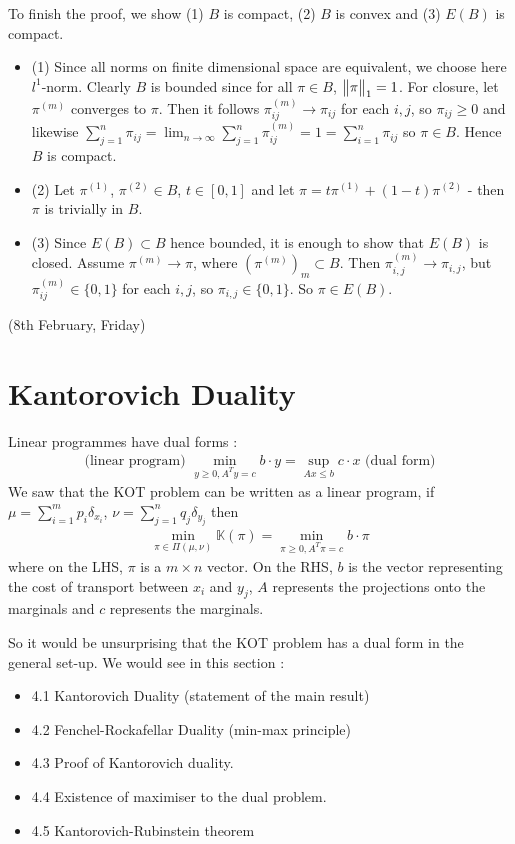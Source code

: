 \documentclass[12pt,a4paper]{article}
\newenvironment{proof}
{\begin{changemargin}{1cm}{0.5cm} 
	}%
	{\end{changemargin}
}
\renewenvironment{i}
{\begin{itemize} 
	}%
	{\end{itemize}
}
\begin{document}
\begin{proof}
To finish the proof, we show (1) $B$ is compact, (2) $B$ is convex and (3) $E(B)$ is compact.
\begin{i}
\item[(1)] Since all norms on finite dimensional space are equivalent, we choose here $l^1$-norm. Clearly $B$ is bounded since for all $\pi \in B$, $\bigl\lVert\pi\bigr\rVert_{1}=1$. For closure, let $\pi^{(m)}$ converges to $\pi$. Then it follows $\pi_{ij}^{(m)} \rightarrow \pi_{ij}$ for each $i,j$, so $\pi_{ij}\geq 0$ and likewise $\sum_{j=1}^n \pi_{ij} = \lim_{n\rightarrow \infty} \sum_{j=1}^n \pi_{ij}^{(m)} =1 = \sum_{i=1}^n \pi_{ij}$ so $\pi \in B$. Hence $B$ is compact.
\item[(2)] Let $\pi^{(1)}$, $\pi^{(2)} \in B$, $t \in [0,1]$ and let $\pi = t\pi^{(1)} + (1-t) \pi^{(2)}$ - then $\pi$ is trivially in $B$.
\item[(3)] Since $E(B) \subset B$ hence bounded, it is enough to show that $E(B)$ is closed. Assume $\pi^{(m)} \rightarrow \pi$, where $(\pi^{(m)})_m \subset B$. Then $\pi^{(m)}_{i,j} \rightarrow \pi_{i,j}$, but $\pi^{(m)}_{ij} \in \{0,1\}$ for each $i,j$, so $\pi_{i,j} \in \{0,1\}$. So $\pi \in E(B)$. 
\end{i}
\eop
\end{proof}
\s

\newday

(8th February, Friday)
\s

\section{Kantorovich Duality}

Linear programmes have dual forms :
\begin{align*}
\text{(linear program)} \,\, \min_{y\geq 0, A^T y=c} b\cdot y = \sup_{Ax \leq b} c\cdot x \,\, \text{(dual form)}
\end{align*}
We saw that the KOT problem can be written as a linear program, if $\mu = \sum_{i=1}^m p_i \delta_{x_i}$, $\nu = \sum_{j=1}^n q_j \delta_{y_j}$ then
\begin{align*}
\min_{\pi \in \Pi(\mu, \nu)} \mathbb{K} (\pi) = \min_{ \pi \geq 0, A^T \pi =c } b\cdot \pi
\end{align*}
where on the LHS, $\pi$ is a $m\times n$ vector. On the RHS, $b$ is the vector representing the cost of transport between $x_i$ and $y_j$, $A$ represents the projections onto the marginals and $c$ represents the marginals.
\s

So it would be unsurprising that the KOT problem has a dual form in the general set-up. We would see in this section :
\begin{i}
\item[4.1] Kantorovich Duality (statement of the main result)
\item[4.2] Fenchel-Rockafellar Duality (min-max principle)
\item[4.3] Proof of Kantorovich duality.
\item[4.4] Existence of maximiser to the dual problem.
\item[4.5] Kantorovich-Rubinstein theorem
\end{i}
\end{document}
